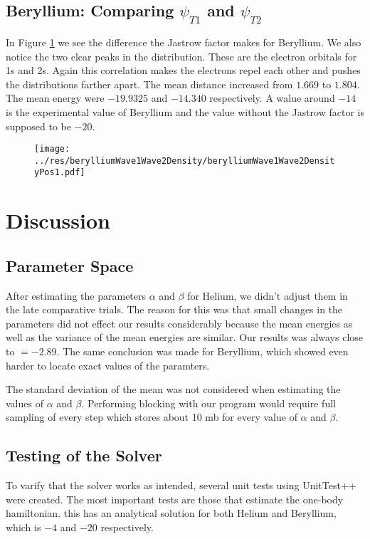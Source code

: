 \documentclass[twocolumn]{article}[10pt]
\begin{document}
\subsection{Beryllium: Comparing $\psi_{T1}$ and $\psi_{T2}$}
In Figure \ref{fig:6} we see the difference the Jastrow factor makes for Beryllium. 
We also notice the two clear peaks in the distribution. These are
the electron orbitals for 1s and 2s. Again this
correlation makes the electrons repel each other and pushes the distributions
farther apart. The mean distance increased from $1.669$ to $1.804$. 
The mean energy were $-19.9325$ and $-14.340$ respectively. A walue around
$-14$ is the experimental value of Beryllium and the value without the 
Jastrow factor is supposed to be $-20$. 
\begin{figure}[h!]
	\centering
	\texttt{[image: ../res/berylliumWave1Wave2Density/berylliumWave1Wave2DensityPos1.pdf]}
	\caption{}\label{fig:6}
\end{figure}




\section{Discussion}
\subsection{Parameter Space}
After estimating the parameters $\alpha$ and $\beta$ for 
Helium, we didn't adjust them in the late comparative trials. The reason
for this was that small changes in the parameters did not effect
our results considerably because the mean energies as well as the variance of the mean energies are similar. Our results was always close to 
$=-2.89$. The same conclusion was made for Beryllium, which
showed even harder to locate exact values of the paramters.  

The standard deviation of the mean was not considered when estimating the values 
of $\alpha$ and $\beta$. Performing blocking with our program would require full 
sampling of every step which stores about 10 mb for every value of $\alpha$ and $\beta$. 
\subsection{Testing of the Solver}
To varify that the solver works as intended, several unit tests
using UnitTest++ were created. The most important tests 
are those that estimate the one-body hamiltonian. this has
an analytical solution for both Helium and Beryllium, which is $-4$
and $-20$ respectively. 
\end{document}
